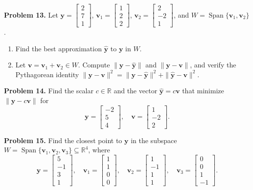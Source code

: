 \documentclass[11pt, letterpaper]{article}
\theoremstyle{definition}
\theoremstyle{remark}
\newcommand{\R}{\mathbb{R}}
\begin{document}
\textbf{Problem 13.} Let $\mathbf{y} = \begin{bmatrix} 2 \\ 7 \\ 1 \end{bmatrix}$, $\mathbf{v}_1 = \begin{bmatrix} 1 \\ 2 \\ 2 \end{bmatrix}$, $\mathbf{v}_2 = \begin{bmatrix} 2 \\ -2 \\ 1 \end{bmatrix}$, and $W = \operatorname{Span}\{\mathbf{v}_1, \mathbf{v}_2\}$.
\begin{enumerate}[label=(\alph*)]
    \item Find the best approximation $\hat{\mathbf{y}}$ to $\mathbf{y}$ in $W$.
    \item Let $\mathbf{v} = \mathbf{v}_1 + \mathbf{v}_2 \in W$. Compute $\|\mathbf{y} - \hat{\mathbf{y}}\|$ and $\|\mathbf{y} - \mathbf{v}\|$, and verify the Pythagorean identity $\|\mathbf{y} - \mathbf{v}\|^2 = \|\mathbf{y} - \hat{\mathbf{y}}\|^2 + \|\hat{\mathbf{y}} - \mathbf{v}\|^2$.
\end{enumerate}

\textbf{Problem 14.} Find the scalar $c \in \R$ and the vector $\hat{\mathbf{y}} = c\mathbf{v}$ that minimize $\|\mathbf{y} - c\mathbf{v}\|$ for
\[
\mathbf{y} = \begin{bmatrix} -2 \\ 5 \\ 4 \end{bmatrix}, \quad \mathbf{v} = \begin{bmatrix} 1 \\ -2 \\ 2 \end{bmatrix}.
\]

\textbf{Problem 15.} Find the closest point to $\mathbf{y}$ in the subspace $W = \operatorname{Span}\{\mathbf{v}_1, \mathbf{v}_2, \mathbf{v}_3\} \subseteq \R^4$, where
\[
\mathbf{y} = \begin{bmatrix} 5 \\ -1 \\ 3 \\ 1 \end{bmatrix}, \quad \mathbf{v}_1 = \begin{bmatrix} 1 \\ 1 \\ 0 \\ 0 \end{bmatrix}, \quad \mathbf{v}_2 = \begin{bmatrix} 1 \\ -1 \\ 1 \\ 1 \end{bmatrix}, \quad \mathbf{v}_3 = \begin{bmatrix} 0 \\ 0 \\ 1 \\ -1 \end{bmatrix}.
\]
\end{document}
